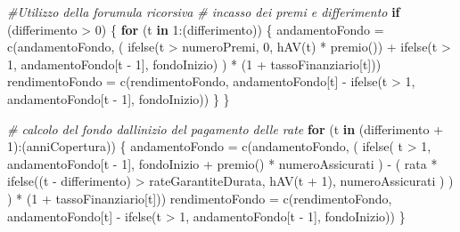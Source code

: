 \documentclass[
]{article}
\newenvironment{Shaded}{\begin{snugshade}}{\end{snugshade}}
\newcommand{\CommentTok}[1]{\textcolor[rgb]{0.56,0.35,0.01}{\textit{#1}}}
\newcommand{\ControlFlowTok}[1]{\textcolor[rgb]{0.13,0.29,0.53}{\textbf{#1}}}
\newcommand{\DecValTok}[1]{\textcolor[rgb]{0.00,0.00,0.81}{#1}}
\newcommand{\FunctionTok}[1]{\textcolor[rgb]{0.00,0.00,0.00}{#1}}
\newcommand{\NormalTok}[1]{#1}
\newcommand{\OtherTok}[1]{\textcolor[rgb]{0.56,0.35,0.01}{#1}}
\newcommand{\SpecialCharTok}[1]{\textcolor[rgb]{0.00,0.00,0.00}{#1}}
\begin{document}
\begin{Shaded}
\begin{Highlighting}[]
  \CommentTok{\#Utilizzo della forumula ricorsiva}
  \CommentTok{\# incasso dei premi e differimento}
  \ControlFlowTok{if}\NormalTok{ (differimento }\SpecialCharTok{\textgreater{}} \DecValTok{0}\NormalTok{) \{}
    \ControlFlowTok{for}\NormalTok{ (t }\ControlFlowTok{in} \DecValTok{1}\SpecialCharTok{:}\NormalTok{(differimento))}
\NormalTok{    \{}
\NormalTok{      andamentoFondo }\OtherTok{=} \FunctionTok{c}\NormalTok{(andamentoFondo,}
\NormalTok{                         (}
                           \FunctionTok{ifelse}\NormalTok{(t }\SpecialCharTok{\textgreater{}}\NormalTok{ numeroPremi, }\DecValTok{0}\NormalTok{, }\FunctionTok{hAV}\NormalTok{(t) }\SpecialCharTok{*} \FunctionTok{premio}\NormalTok{()) }\SpecialCharTok{+}
                             \FunctionTok{ifelse}\NormalTok{(t }\SpecialCharTok{\textgreater{}} \DecValTok{1}\NormalTok{, andamentoFondo[t }\SpecialCharTok{{-}}
                                                            \DecValTok{1}\NormalTok{], fondoInizio)}
\NormalTok{                         ) }\SpecialCharTok{*}\NormalTok{ (}\DecValTok{1} \SpecialCharTok{+}\NormalTok{ tassoFinanziario[t]))}
\NormalTok{      rendimentoFondo }\OtherTok{=} \FunctionTok{c}\NormalTok{(rendimentoFondo,}
\NormalTok{                          andamentoFondo[t] }\SpecialCharTok{{-}} \FunctionTok{ifelse}\NormalTok{(t }\SpecialCharTok{\textgreater{}} \DecValTok{1}\NormalTok{, andamentoFondo[t }\SpecialCharTok{{-}} \DecValTok{1}\NormalTok{], fondoInizio))}
\NormalTok{    \}}
\NormalTok{  \}}
  
  \CommentTok{\# calcolo del fondo dall\textquotesingle{}inizio del pagamento delle rate}
  \ControlFlowTok{for}\NormalTok{ (t }\ControlFlowTok{in}\NormalTok{ (differimento }\SpecialCharTok{+} \DecValTok{1}\NormalTok{)}\SpecialCharTok{:}\NormalTok{(anniCopertura))}
\NormalTok{  \{}
\NormalTok{    andamentoFondo }\OtherTok{=} \FunctionTok{c}\NormalTok{(andamentoFondo, (}
      \FunctionTok{ifelse}\NormalTok{(}
\NormalTok{        t }\SpecialCharTok{\textgreater{}} \DecValTok{1}\NormalTok{,}
\NormalTok{        andamentoFondo[t }\SpecialCharTok{{-}} \DecValTok{1}\NormalTok{],}
\NormalTok{        fondoInizio }\SpecialCharTok{+} \FunctionTok{premio}\NormalTok{() }\SpecialCharTok{*}\NormalTok{ numeroAssicurati}
\NormalTok{      ) }\SpecialCharTok{{-}}
\NormalTok{        (}
\NormalTok{          rata }\SpecialCharTok{*} \FunctionTok{ifelse}\NormalTok{((t }\SpecialCharTok{{-}}\NormalTok{ differimento) }\SpecialCharTok{\textgreater{}}\NormalTok{ rateGarantiteDurata,}
                        \FunctionTok{hAV}\NormalTok{(t }\SpecialCharTok{+} \DecValTok{1}\NormalTok{),}
\NormalTok{                        numeroAssicurati}
\NormalTok{          )}
\NormalTok{        )}
\NormalTok{    ) }\SpecialCharTok{*}\NormalTok{ (}\DecValTok{1} \SpecialCharTok{+}\NormalTok{ tassoFinanziario[t]))}
\NormalTok{    rendimentoFondo }\OtherTok{=} \FunctionTok{c}\NormalTok{(rendimentoFondo,}
\NormalTok{                        andamentoFondo[t] }\SpecialCharTok{{-}} \FunctionTok{ifelse}\NormalTok{(t }\SpecialCharTok{\textgreater{}} \DecValTok{1}\NormalTok{, andamentoFondo[t }\SpecialCharTok{{-}} \DecValTok{1}\NormalTok{], fondoInizio))}
\NormalTok{  \}}
  

\end{Highlighting}
\end{Shaded}
\end{document}
